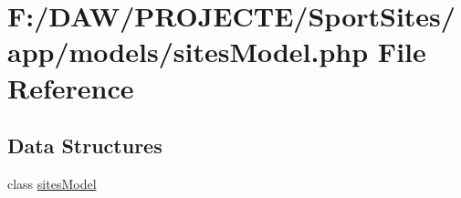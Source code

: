 \hypertarget{sites_model_8php}{}\section{F\+:/\+D\+A\+W/\+P\+R\+O\+J\+E\+C\+T\+E/\+Sport\+Sites/app/models/sites\+Model.php File Reference}
\label{sites_model_8php}
\subsection*{Data Structures}
\begin{DoxyCompactItemize}
\item 
class \hyperlink{classsites_model}{sites\+Model}
\end{DoxyCompactItemize}
